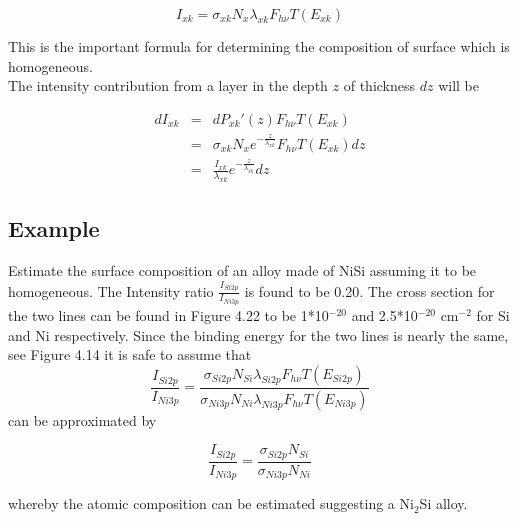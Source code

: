             \begin{equation}
          I_{xk} = \sigma_{xk}N_{x}\lambda_{xk}F_{h\nu}T(E_{xk})
          \end{equation}

             \noindent This is the important formula for determining
          the composition of surface which is homogeneous.\\

          The intensity contribution from a layer in the depth $z$ of
          thickness $dz$ will be

\begin{eqnarray}
dI_{xk} & = & dP_{xk}'(z)F_{h\nu}T(E_{xk})\\
        & = & \sigma_{xk}N_{x}e^{-\frac{z}{\lambda_{xk}}}F_{h\nu}T(E_{xk})dz\\
        & = & \frac{I_{xk}}{\lambda_{xk}}e^{-\frac{z}{\lambda_{xk}}}dz
\end{eqnarray}



       \subsection{Example}

         Estimate the surface composition of an alloy
          made of NiSi assuming it to be homogeneous. The Intensity
          ratio $\frac{I_{Si2p}}{I_{Ni3p}}$ is found to be 0.20. The
          cross section for the two lines can be found in Figure 4.22
          to be 1*10$^{-20}$ and 2.5*10$^{-20}$ cm$^{-2}$ for Si and Ni
          respectively. Since the binding energy for the two lines is
          nearly the same, see Figure 4.14 it is safe to assume that
          \begin{equation} \frac{I_{Si2p}}{I_{Ni3p}} =
          \frac{\sigma_{Si2p}N_{Si}\lambda_{Si2p}F_{h\nu}T(E_{Si2p})}{\sigma_{Ni3p}N_{Ni}\lambda_{Ni3p}F_{h\nu}T(E_{Ni3p})}
          \end{equation} can be approximated by

\begin{equation}
          \frac{I_{Si2p}}{I_{Ni3p}}                                  =
          \frac{\sigma_{Si2p}N_{Si}}{\sigma_{Ni3p}N_{Ni}}
          \end{equation}

             whereby the atomic composition can be estimated
          suggesting a Ni$_{2}$Si alloy.\\

\vspace{1cm}

